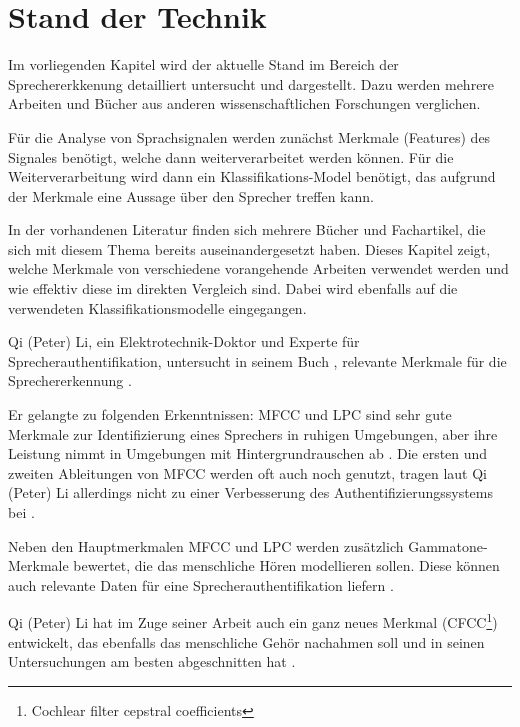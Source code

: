 \section{Stand der Technik} \label{sec:StandDerTechnik}

\textauthor{\vJB}{}{}

Im vorliegenden Kapitel wird der aktuelle Stand im Bereich der Sprechererkkenung detailliert untersucht und dargestellt.
Dazu werden mehrere Arbeiten und Bücher aus anderen wissenschaftlichen Forschungen verglichen.

Für die Analyse von Sprachsignalen werden zunächst Merkmale (Features) des Signales benötigt, welche dann weiterverarbeitet werden können.
Für die Weiterverarbeitung wird dann ein Klassifikations-Model benötigt, das aufgrund der Merkmale eine Aussage über den Sprecher treffen kann.

In der vorhandenen Literatur finden sich mehrere Bücher und Fachartikel, die sich mit diesem Thema bereits auseinandergesetzt haben. 
Dieses Kapitel zeigt, welche Merkmale von verschiedene vorangehende Arbeiten verwendet werden und wie effektiv diese im direkten Vergleich sind. Dabei wird ebenfalls auf die verwendeten Klassifikationsmodelle eingegangen.

Qi (Peter) Li, ein Elektrotechnik-Doktor und Experte für Sprecherauthentifikation, untersucht in seinem Buch , relevante Merkmale für die Sprechererkennung \autocite{li_speaker_2012}.

Er gelangte zu folgenden Erkenntnissen:
\ac{MFCC} und \ac{LPC} sind sehr gute Merkmale zur Identifizierung eines Sprechers in ruhigen Umgebungen, aber ihre Leistung nimmt in Umgebungen mit Hintergrundrauschen ab \autocite[vgl.][S. 136]{li_speaker_2012}.
Die ersten und zweiten Ableitungen von \ac{MFCC} werden oft auch noch genutzt, tragen laut Qi (Peter) Li allerdings nicht zu einer Verbesserung des Authentifizierungssystems bei \autocite[vgl.][S. 143]{li_speaker_2012}.

Neben den Hauptmerkmalen \ac{MFCC} und \ac{LPC} werden zusätzlich Gammatone-Merkmale bewertet, die das menschliche Hören modellieren sollen.
Diese können auch relevante Daten für eine Sprecherauthentifikation liefern \autocite[vgl.][S. 111, 117]{li_speaker_2012}.

Qi (Peter) Li hat im Zuge seiner Arbeit auch ein ganz neues Merkmal (CFCC\footnote{Cochlear filter cepstral coefficients}) entwickelt, das ebenfalls das menschliche Gehör nachahmen soll und in seinen Untersuchungen am besten abgeschnitten hat \autocite[vgl.][S. 135]{li_speaker_2012}.

